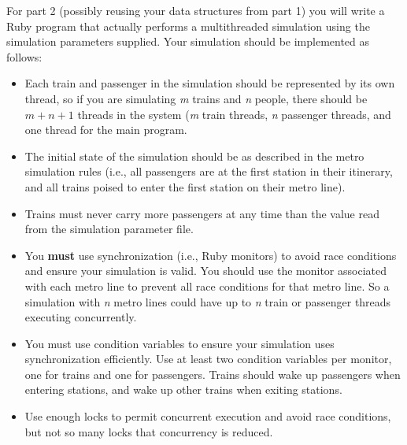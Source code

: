 \documentclass[11pt]{article}
\begin{document}
      For part 2 (possibly reusing your data structures from part 1) you will
    write a Ruby program that actually performs a multithreaded simulation
    using the simulation parameters supplied. Your simulation should be
    implemented as follows:

      \vspace{-2mm}

      \begin{itemize}

        \addtolength{\itemsep}{-.75mm}

        \item Each train and passenger in the simulation should be
              represented by its own thread, so if you are simulating
              \emph{m} trains and \emph{n} people, there should be $m + n +
              1$ threads in the system (\emph{m} train threads, \emph{n}
              passenger threads, and one thread for the main program.

        \item The initial state of the simulation should be as described in
              the metro simulation rules (i.e., all passengers are at the
              first station in their itinerary, and all trains poised to
              enter the first station on their metro line).

        \item Trains must never carry more passengers at any time than the
              value read from the simulation parameter file.

        \item You \textbf{must} use synchronization (i.e., Ruby monitors) to
              avoid race conditions and ensure your simulation is valid.
              You should use the monitor associated with each metro line to
              prevent all race conditions for that metro line.  So a
              simulation with \emph{n} metro lines could have up to \emph{n}
              train or passenger threads executing concurrently.

        \item You must use condition variables to ensure your simulation
              uses synchronization efficiently.  Use at least two condition
              variables per monitor, one for trains and one for
              passengers.  Trains should wake up passengers when entering
              stations, and wake up other trains when exiting stations.

        \item Use enough locks to permit concurrent execution and avoid race
              conditions, but not so many locks that concurrency is reduced.


\end{itemize}
\end{document}
